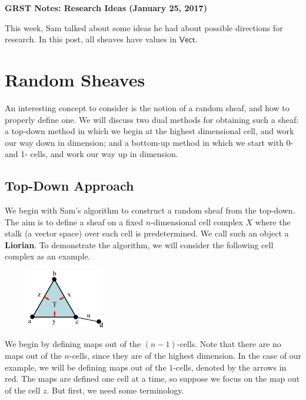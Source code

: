 \documentclass{article}
\theoremstyle{definition}
\begin{document}
\begin{center}
	\large \textbf{GRST Notes: Research Ideas (January 25, 2017)} \\
\end{center}

This week, Sam talked about some ideas he had about possible directions for research. In this post, all sheaves have values in $\textsf{Vect}$. 

\section{Random Sheaves}
An interesting concept to consider is the notion of a random sheaf, and how to properly define one. We will discuss two dual methods for obtaining such a sheaf: a top-down method in which we begin at the highest dimensional cell, and work our way down in dimension; and a bottom-up method in which we start with 0- and 1- cells, and work our way up in dimension. 

\subsection{Top-Down Approach}

We begin with Sam's algorithm to construct a random sheaf from the top-down. The aim is to define a sheaf on a fixed $n$-dimensional cell complex $X$ where the stalk (a vector space) over each cell is predetermined. We call such an object a \textbf{Liorian}. To demonstrate the algorithm, we will consider the following cell complex as an example. 	

\begin{figure}[!htbp]
\centering
	\includegraphics[width=0.3\textwidth]{images/triangle_step1.eps}
\end{figure}

We begin by defining maps out of the $(n-1)$-cells. Note that there are no maps out of the $n$-cells, since they are of the highest dimension. In the case of our example, we will be defining maps out of the $1$-cells, denoted by the arrows in red. The maps are defined one cell at a time, so suppose we focus on the map out of the cell $z$.  But first, we need some terminology.
\end{document}
